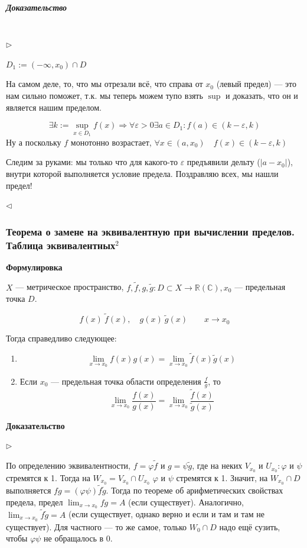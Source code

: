 \documentclass{article}
\def\dbl{\,\,}
\let\vanillasubparagraph\subparagraph
\renewcommand{\subparagraph}[1]{\vanillasubparagraph{#1}\mbox{}\\}
\begin{document}
\subparagraph{Доказательство}
$\rhd$

$D_1 := (-\infty, x_0) \cap D$

На самом деле, то, что мы отрезали всё, что справа от $x_0$ (левый предел) --- это нам сильно поможет, т.к. мы теперь можем тупо взять $\sup$ и доказать, что он и является нашим пределом. 

$$
\exists k := \sup_{x \in D_1} f(x) \Rightarrow \forall \varepsilon > 0 \exists a \in D_1 : f(a) \in (k-\varepsilon, k)
$$
Ну а поскольку $f$ монотонно возрастает, $\forall x \in (a, x_0) \quad f(x) \in (k-\varepsilon, k)$

Следим за руками: мы только что для какого-то $\varepsilon$ предъявили дельту ($|a - x_0|$), внутри которой выполняется условие предела. Поздравляю всех, мы нашли предел!

$\lhd$


\subsubsection{Теорема о замене на эквивалентную при вычислении пределов.\texorpdfstring{\\}{} Таблица эквивалентных\texorpdfstring{$^2$}{}}

\textbf{Формулировка}

$X$ --- метрическое пространство, $f, \tilde{f}, g, \tilde{g}: D \subset X \rightarrow \mathbb{R} (\mathbb{C}), x_0$ --- предельная точка $D$.

\[f(x) ~ \tilde{f}(x), \quad g(x) ~ \tilde{g}(x) \qquad x \rightarrow x_0\]

Тогда справедливо следующее:

\begin{enumerate}
    \item \[\lim_{x \rightarrow x_0}{f(x)g(x)} = \lim_{x \rightarrow x_0}{\tilde{f}(x)\tilde{g}(x)}\]
    \item Если $x_0$ --- предельная точка области определения $\frac{f}{g}$, то \[\lim_{x \rightarrow x_0}{\frac{f(x)}{g(x)}} = \lim_{x \rightarrow x_0}{\frac{\tilde{f}(x)}{\tilde{g}(x)}}\]
\end{enumerate}

\textbf{Доказательство}

$\rhd$

По определению эквивалентности, $f = \varphi\tilde{f}$ и $g = \psi\tilde{g}$, где на неких $V_{x_0}$ и $U_{x_0} : \varphi$ и $\psi$ стремятся к 1. Тогда на $W_{x_0} = V_{x_0} \cap U_{x_0} \dbl \varphi$ и $\psi$ стремятся к 1. Значит, на $W_{x_0} \cap D$ выполняется $fg = (\varphi\psi) \tilde{f}\tilde{g}$. Тогда по теореме об арифметических свойствах предела, предел $\lim_{x \rightarrow x_0} fg = A$ (если существует). Аналогично, $\lim_{x \rightarrow x_0} \tilde{f}\tilde{g} = A$ (если существует, однако верно и если и там и там не существует). Для частного --- то же самое, только $W_0 \cap D$ надо ещё сузить, чтобы $\varphi\psi$ не обращалось в 0.
\end{document}
